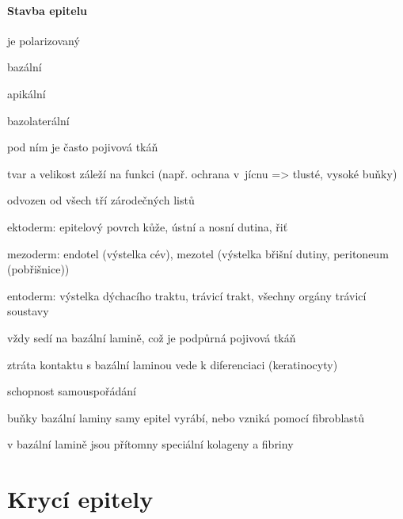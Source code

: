\documentclass[DIV=8]{scrreprt}
\begin{document}
\paragraph{Stavba epitelu}
\begin{myItemize}[nosep]
    \item je polarizovaný
\begin{myItemize}[nosep]
    \item bazální
    \item apikální
    \item bazolaterální
\end{myItemize}

    \item pod ním je často pojivová tkáň
    \item tvar a velikost záleží na funkci (např. ochrana v jícnu => tlusté, vysoké buňky)
    \item odvozen od všech tří zárodečných listů
\begin{myItemize}[nosep]
    \item ektoderm: epitelový povrch kůže, ústní a nosní dutina, řiť
    \item mezoderm: endotel (výstelka cév), mezotel (výstelka břišní dutiny, peritoneum (pobřišnice))
    \item entoderm: výstelka dýchacího traktu, trávicí trakt, všechny orgány trávicí soustavy
\end{myItemize}

    \item vždy sedí na bazální lamině, což je podpůrná pojivová tkáň
\begin{myItemize}[nosep]
    \item ztráta kontaktu s bazální laminou vede k diferenciaci (keratinocyty)
    \item schopnost samouspořádání
    \item buňky bazální laminy samy epitel vyrábí, nebo vzniká pomocí fibroblastů
    \item v bazální lamině jsou přítomny speciální kolageny a fibriny
\end{myItemize}

\end{myItemize}



\section{Krycí epitely} \label{Krycí epitely} \FloatBarrier
\end{document}
